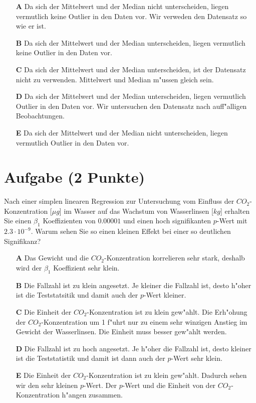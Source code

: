 \documentclass[a4paper, 10pt]{scrartcl}\usepackage[]{graphicx}\usepackage[]{xcolor}
\begin{document}
\begin{enumerate}
\item [\textbf{A} \msquare] Da sich der Mittelwert und der Median nicht unterscheiden, liegen vermutlich keine Outlier in den Daten vor. Wir verweden den Datensatz so wie er ist.
\item [\textbf{B} \msquare] Da sich der Mittelwert und der Median unterscheiden, liegen vermutlich keine Outlier in den Daten vor.
\item [\textbf{C} \msquare] Da sich der Mittelwert und der Median unterscheiden, ist der Datensatz nicht zu verwenden. Mittelwert und Median m{"u}ssen gleich sein.
\item [\textbf{D} \msquare] Da sich der Mittelwert und der Median unterscheiden, liegen vermutlich Outlier in den Daten vor. Wir untersuchen den Datensatz nach auff{"a}lligen Beobachtungen.
\item [\textbf{E} \msquare] Da sich der Mittelwert und der Median nicht unterscheiden, liegen vermutlich Outlier in den Daten vor.
\end{enumerate}

\section{Aufgabe \hfill (2 Punkte)}

Nach einer simplen linearen Regression zur Untersuchung vom Einfluss der
$CO_2$-Konzentration [$\mu g$] im Wasser auf das Wachstum von Wasserlinsen
[$kg$] erhalten Sie einen $\beta_1$ Koeffizienten von $0.00001$ und einen
hoch signifikanten $p$-Wert mit $2.3\cdot 10^{-9}$. Warum sehen Sie so einen kleinen
Effekt bei einer so deutlichen Signifikanz? 




\begin{enumerate}
\item [\textbf{A} \msquare] Das Gewicht und die $CO_2$-Konzentration korrelieren sehr stark, deshalb wird der $\beta_1$ Koeffizient sehr klein.
\item [\textbf{B} \msquare] Die Fallzahl ist zu klein angesetzt. Je kleiner die Fallzahl ist, desto h{"o}her ist die Teststatsitik und damit auch der $p$-Wert kleiner. 
\item [\textbf{C} \msquare] Die Einheit der $CO_2$-Konzentration ist zu klein gew{"a}hlt. Die Erh{"o}hung der $CO_2$-Konzentration um 1 f{"u}hrt nur zu einem sehr winzigen Anstieg im Gewicht der Wasserlinsen. Die Einheit muss besser gew{"a}hlt werden.
\item [\textbf{D} \msquare] Die Fallzahl ist zu hoch angesetzt. Je h{"o}her die Fallzahl ist, desto kleiner ist die Teststatistik und damit ist dann auch der $p$-Wert sehr klein.
\item [\textbf{E} \msquare] Die Einheit der $CO_2$-Konzentration ist zu klein gew{"a}hlt. Dadurch sehen wir den sehr kleinen $p$-Wert. Der $p$-Wert und die Einheit von der $CO_2$-Konzentration h{"a}ngen zusammen.
\end{enumerate}
\end{document}
